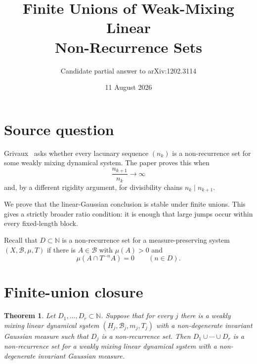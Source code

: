 \documentclass[11pt]{article}
\title{Finite Unions of Weak-Mixing Linear\\Non-Recurrence Sets}
\author{Candidate partial answer to arXiv:1202.3114}
\date{11 August 2026}
\newtheorem{theorem}{Theorem}
\begin{document}
\maketitle

\begin{center}
\end{center}

\section{Source question}

Grivaux~\cite{G} asks whether every lacunary sequence $(n_k)$ is a
non-recurrence set for some weakly mixing dynamical system.  The paper proves
this when
\[
 \frac{n_{k+1}}{n_k}\longrightarrow\infty
\]
and, by a different rigidity argument, for divisibility chains
$n_k\mid n_{k+1}$.

We prove that the linear-Gaussian conclusion is stable under finite unions.
This gives a strictly broader ratio condition: it is enough that large jumps
occur within every fixed-length block.

Recall that $D\subset\mathbb N$ is a non-recurrence set for a
measure-preserving system $(X,\mathcal B,\mu,T)$ if there is
$A\in\mathcal B$ with $\mu(A)>0$ and
\[
 \mu(A\cap T^{-n}A)=0\qquad(n\in D).
\]

\section{Finite-union closure}

\begin{theorem}\label{thm:union}
Let $D_1,\ldots,D_r\subset\mathbb N$.  Suppose that for every $j$ there is a
weakly mixing linear dynamical system $(H_j,\mathcal B_j,m_j,T_j)$ with a
non-degenerate invariant Gaussian measure such that $D_j$ is a
non-recurrence set.  Then $D_1\cup\cdots\cup D_r$ is a non-recurrence set for
a weakly mixing linear dynamical system with a non-degenerate invariant
Gaussian measure.
\end{theorem}
\end{document}
